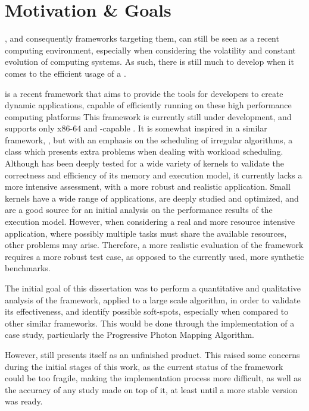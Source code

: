 \documentclass[main.tex]{subfiles}
\begin{document}
\section{Motivation \& Goals}

\hetplats, and consequently frameworks targeting them, can still be seen as a recent computing environment, especially when considering the volatility and constant evolution of computing systems. As such, there is still much to develop when it comes to the efficient usage of a \hetplat.

\gama is a recent framework that aims to provide the tools for developers to create dynamic applications, capable of efficiently running on these high performance computing platforms \cite{joao2012gama}
This framework is currently still under development, and supports only x86-64 \cpus and \cuda-capable \gpus. It is somewhat inspired in a similar framework, \starpu, but with an emphasis on the scheduling of irregular algorithms, a class which presents extra problems when dealing with workload scheduling. Although \gama has been deeply tested for a wide variety of kernels to validate the correctness and efficiency of its memory and execution model, it currently lacks a more intensive assessment, with a more robust and realistic application.
Small kernels have a wide range of applications, are deeply studied and optimized, and are a good source for an initial analysis on the performance results of the execution model. However, when considering a real and more resource intensive application, where possibly multiple tasks must share the available resources, other problems may arise. Therefore, a more realistic evaluation of the framework requires a more robust test case, as opposed to the currently used, more synthetic benchmarks.

The initial goal of this dissertation was to perform a quantitative and qualitative analysis of the \gama framework, applied to a large scale algorithm, in order to validate its effectiveness, and identify possible soft-spots, especially when compared to other similar frameworks. This would be done through the implementation of a case study, particularly the Progressive Photon Mapping Algorithm.

However, \gama still presents itself as an unfinished product. This raised some concerns during the initial stages of this work, as the current status of the framework could be too fragile, making the implementation process more difficult, as well as the accuracy of any study made on top of it, at least until a more stable version was ready.
\end{document}

